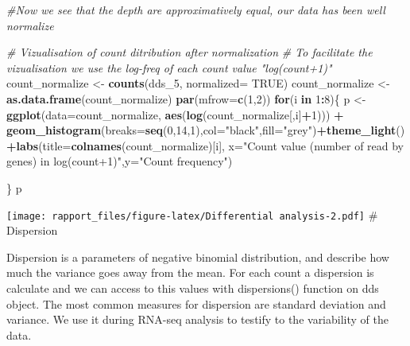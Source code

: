 \documentclass[]{article}
\newenvironment{Shaded}{\begin{snugshade}}{\end{snugshade}}
\newcommand{\KeywordTok}[1]{\textcolor[rgb]{0.13,0.29,0.53}{\textbf{#1}}}
\newcommand{\DataTypeTok}[1]{\textcolor[rgb]{0.13,0.29,0.53}{#1}}
\newcommand{\DecValTok}[1]{\textcolor[rgb]{0.00,0.00,0.81}{#1}}
\newcommand{\StringTok}[1]{\textcolor[rgb]{0.31,0.60,0.02}{#1}}
\newcommand{\CommentTok}[1]{\textcolor[rgb]{0.56,0.35,0.01}{\textit{#1}}}
\newcommand{\OtherTok}[1]{\textcolor[rgb]{0.56,0.35,0.01}{#1}}
\newcommand{\ControlFlowTok}[1]{\textcolor[rgb]{0.13,0.29,0.53}{\textbf{#1}}}
\newcommand{\OperatorTok}[1]{\textcolor[rgb]{0.81,0.36,0.00}{\textbf{#1}}}
\newcommand{\NormalTok}[1]{#1}
\begin{document}
\begin{Shaded}
\begin{Highlighting}[]
\CommentTok{#Now we see that the depth are approximatively equal, our data has been well normalize}

\CommentTok{# Vizualisation of count ditribution after normalization}
\CommentTok{# To facilitate the vizualisation we use the log-freq of each count value "log(count+1)"}
\NormalTok{count_normalize <-}\StringTok{ }\KeywordTok{counts}\NormalTok{(dds_}\DecValTok{5}\NormalTok{, }\DataTypeTok{normalized=} \OtherTok{TRUE}\NormalTok{)}
\NormalTok{count_normalize <-}\KeywordTok{as.data.frame}\NormalTok{(count_normalize)}
\KeywordTok{par}\NormalTok{(}\DataTypeTok{mfrow=}\KeywordTok{c}\NormalTok{(}\DecValTok{1}\NormalTok{,}\DecValTok{2}\NormalTok{))}
\ControlFlowTok{for}\NormalTok{(i }\ControlFlowTok{in} \DecValTok{1}\OperatorTok{:}\DecValTok{8}\NormalTok{)\{}
\NormalTok{p <-}\StringTok{ }\KeywordTok{ggplot}\NormalTok{(}\DataTypeTok{data=}\NormalTok{count_normalize, }\KeywordTok{aes}\NormalTok{(}\KeywordTok{log}\NormalTok{(count_normalize[,i]}\OperatorTok{+}\DecValTok{1}\NormalTok{))) }\OperatorTok{+}\StringTok{ }\KeywordTok{geom_histogram}\NormalTok{(}\DataTypeTok{breaks=}\KeywordTok{seq}\NormalTok{(}\DecValTok{0}\NormalTok{,}\DecValTok{14}\NormalTok{,}\DecValTok{1}\NormalTok{),}\DataTypeTok{col=}\StringTok{"black"}\NormalTok{,}\DataTypeTok{fill=}\StringTok{"grey"}\NormalTok{)}\OperatorTok{+}\KeywordTok{theme_light}\NormalTok{()}\OperatorTok{+}\KeywordTok{labs}\NormalTok{(}\DataTypeTok{title=}\KeywordTok{colnames}\NormalTok{(count_normalize)[i], }\DataTypeTok{x=}\StringTok{"Count value (number of read by genes) in log(count+1)"}\NormalTok{,}\DataTypeTok{y=}\StringTok{"Count frequency"}\NormalTok{)}
  
\NormalTok{\}}
\NormalTok{p }
\end{Highlighting}
\end{Shaded}

\texttt{[image: rapport\_files/figure-latex/Differential analysis-2.pdf]}
\# Dispersion

Dispersion is a parameters of negative binomial distribution, and
describe how much the variance goes away from the mean. For each count a
dispersion is calculate and we can access to this values with
dispersions() function on dds object. The most common measures for
dispersion are standard deviation and variance. We use it during RNA-seq
analysis to testify to the variability of the data.
\end{document}
